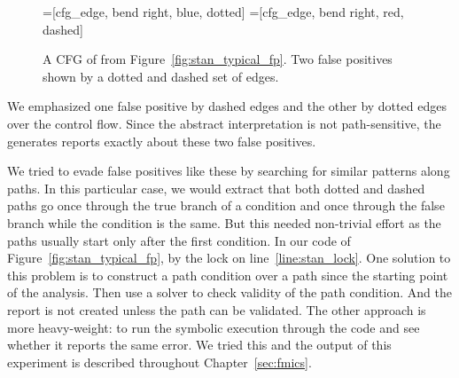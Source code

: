 \begin{figure}[htb]
  \begin{center}
    =[cfg_edge, bend right, blue, dotted]
    =[cfg_edge, bend right, red, dashed]
  \end{center}
    \caption{A CFG of  from Figure~\ref{fig:stan_typical_fp}.
    Two false positives shown by a dotted and dashed set of edges.}
    \label{fig:stan_typical_fp_cfg}
\end{figure}
We emphasized one false positive by dashed edges and the other by dotted edges
over the control flow.  Since the abstract interpretation is not
path-sensitive, the \AC generates reports exactly about these two false
positives.

We tried to evade false positives like these by searching for similar patterns
along paths. In this particular case, we would extract that both dotted and
dashed paths go once through the true branch of a condition and once through
the false branch while the condition is the same. But this needed non-trivial
effort as the paths usually start only after the first condition. In our
code of Figure~\ref{fig:stan_typical_fp}, by the lock on
line~\ref{line:stan_lock}. One solution to this problem is to construct a path
condition over a path since the starting point of the analysis. Then use a
solver to check validity of the path condition. And the report is not created
unless the path can be validated. The other approach is more heavy-weight: to
run the symbolic execution through the code and see whether it reports the
same error.  We tried this and the output of this experiment is described
throughout Chapter~\ref{sec:fmics}.

